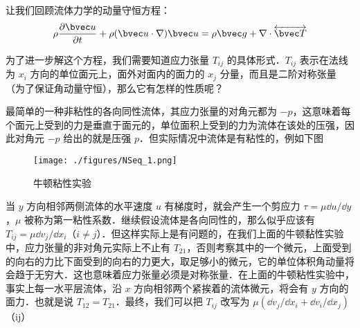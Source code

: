 
让我们回顾流体力学的动量守恒方程：
\begin{equation}
\rho \frac{\partial \bvec u}{\partial t}+\rho(\bvec u\cdot \nabla)\bvec u=\rho \bvec g+\nabla\cdot \overleftrightarrow {\bvec T}
\end{equation}

为了进一步解这个方程，我们需要知道应力张量 $T_{ij}$ 的具体形式．$T_{ij}$ 表示在法线为 $x_i$ 方向的单位面元上，面外对面内的面力的 $x_j$ 分量，而且是二阶对称张量（为了保证角动量守恒），那么它有怎样的性质呢？

最简单的一种非粘性的各向同性流体，其应力张量的对角元都为 $-p$，这意味着每个面元上受到的力是垂直于面元的，单位面积上受到的力为流体在该处的压强，因此对角元 $-p$ 给出的就是压强 $p$．但实际情况中流体是有粘性的，例如下图
\begin{figure}[ht]
\centering
\texttt{[image: ./figures/NSeq\_1.png]}
\caption{牛顿粘性实验} \label{NSeq_fig1}
\end{figure}
当 $y$ 方向相邻两侧流体的水平速度 $u$ 有梯度时，就会产生一个剪应力 $\tau=\mu \dd u/\dd y$，$\mu$ 被称为第一粘性系数．继续假设流体是各向同性的，那么似乎应该有 $T_{ij}=\mu \dd v_j/\dd x_i$（$i\neq j$）．但这样实际上是有问题的，在我们上面的牛顿黏性实验中，应力张量的非对角元实际上不止有 $T_{21}$，否则考察其中的一个微元，上面受到的向右的力比下面受到的向右的力更大，取足够小的微元，它的单位体积角动量将会趋于无穷大．这也意味着应力张量必须是对称张量．在上面的牛顿粘性实验中，事实上每一水平层流体，沿 $x$ 方向相邻两个紧挨着的流体微元，将会有 $y$ 方向的面力．也就是说 $T_{12}=T_{21}$．最终，我们可以把 $T_{ij}$ 改写为 $\mu (\dd v_j/\dd x_i+\dd v_i/\dd x_j)$（i\neq j）